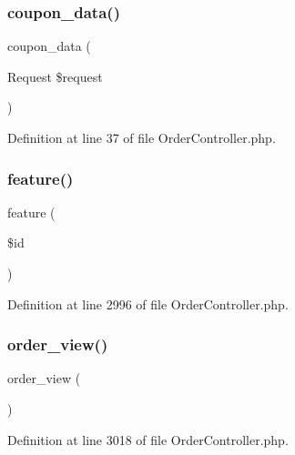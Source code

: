\subsubsection{\texorpdfstring{coupon\_data()}{coupon\_data()}}
{\footnotesize\ttfamily coupon\+\_\+data (\begin{DoxyParamCaption}\item[{Request}]{\$request }\end{DoxyParamCaption})}



Definition at line 37 of file Order\+Controller.\+php.

\mbox{\label{class_responsive_1_1_http_1_1_controllers_1_1_order_controller_ad4318a6b3d8bb110cb44af152f9df7f1}} 
\subsubsection{\texorpdfstring{feature()}{feature()}}
{\footnotesize\ttfamily feature (\begin{DoxyParamCaption}\item[{}]{\$id }\end{DoxyParamCaption})}



Definition at line 2996 of file Order\+Controller.\+php.

\mbox{\label{class_responsive_1_1_http_1_1_controllers_1_1_order_controller_a221b305fa5e607dc92641f05c4d75559}} 
\subsubsection{\texorpdfstring{order\_view()}{order\_view()}}
{\footnotesize\ttfamily order\+\_\+view (\begin{DoxyParamCaption}{ }\end{DoxyParamCaption})}



Definition at line 3018 of file Order\+Controller.\+php.

\mbox{\label{class_responsive_1_1_http_1_1_controllers_1_1_order_controller_a69e28a94775ef5e274ed0a73f471fe4e}} 
